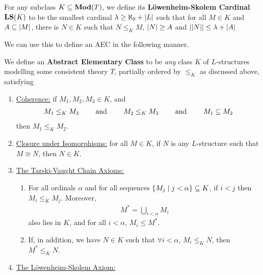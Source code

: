 \begin{boxdefinition}
    For any subclass $K \subseteq \mathbf{Mod}(T)$, we define its \textbf{Löwenheim-Skolem Cardinal $\mathbf{LS}(K)$} to be the smallest cardinal $\lambda \geq \aleph_0 + \left\lvert L \right\rvert$ such that for all $M \in K$ and $A \subseteq \left\lvert M \right\rvert$, there is $N \in K$ such that $N \leq_K M$, $\left\lvert N \right\rvert \geq A$ and $\left\lvert \left\lvert N \right\rvert \right\rvert \leq \lambda + \left\lvert A \right\rvert$
\end{boxdefinition}

We can use this to define an AEC in the following manner.

\begin{boxdefinition}
    We define an \textbf{Abstract Elementary Class} to be \textit{any} class $K$ of $L$-structures modelling some consistent theory $T$, partially ordered by $\leq_K$ as discussed above, satisfying
    \begin{enumerate}
        \item \underline{Coherence:} if $M_1, M_2, M_3 \in K$, and
        \begin{align*}
            M_1 \leq_K M_3
            \qquad \text{ and } \qquad
            M_2 \leq_K M_3
            \qquad \text{ and } \qquad
            M_1 \subseteq M_2
        \end{align*}
        then $M_1 \leq_K M_2$.

        \item \underline{Closure under Isomorphisms:} for all $M \in K$, if $N$ is any $L$-structure such that $M \cong N$, then $N \in K$.

        \item \underline{The Tarski-Vaught Chain Axioms:}
        \begin{enumerate}
            \item For all ordinals $\alpha$ and for all sequences $\left\{ M_j \; \middle\vert \; j < \alpha \right\} \subseteq K$, if $i < j$ then $M_i \leq_K M_j$. Moreover,
            \begin{align*}
                M^{*} = \bigcup_{i < \alpha} M_i
            \end{align*}
            also lies in $K$, and for all $i < \alpha$, $M_i \leq M^*$.

            \item If, in addition, we have $N \in K$ such that $\forall i < \alpha$, $M_i \leq_K N$, then $M^* \leq_K N$.
        \end{enumerate}

        \item \underline{The Löwenheim-Skolem Axiom:}
    \end{enumerate}
\end{boxdefinition}
